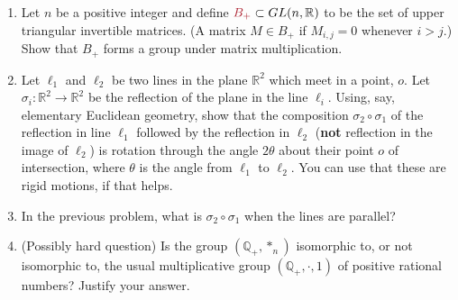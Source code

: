 \documentclass[12pt]{article}
\newcommand{\QQ}{{\mathbb Q}}
\newcommand{\RR}{{\mathbb R}}
\def\defcolor#1{{\color{Maroon}#1}}
\begin{document}
\begin{enumerate}

\item
  Let $n$ be a positive integer and define $\defcolor{B_+}\subset GL(n,\RR)$ to be the set of upper triangular invertible
  matrices.
  (A matrix $M\in B_+$ if $M_{i,j}=0$ whenever $i>j$.)
  Show that $B_+$ forms a group under matrix multiplication.


\item   Let $\ell_1$ and $\ell_2$ be two lines in the plane $\RR^2$ which meet in a point, $o$.
  Let $\sigma_i\colon \RR^2\to\RR^2$ be the reflection of the plane in the line $\ell_i$.
  Using, say, elementary Euclidean geometry, show that the composition $\sigma_2\circ \sigma_1$ of the reflection in line
  $\ell_1$ followed by the reflection in $\ell_2$  {\color{Magenta}({\bf not} reflection in the image of $\ell_2$)} is rotation through the
  angle $2\theta$ about their point $o$ of intersection, where $\theta$ is the angle from $\ell_1$ to $\ell_2$.
  You can use that these are rigid motions, if that helps.


\item  In the previous problem, what is $\sigma_2\circ\sigma_1$ when the lines are parallel?




\item  (Possibly hard question) Is the group $(\QQ_+,*_n)$ isomorphic to, or not isomorphic to, the usual multiplicative group
  $(\QQ_+, \cdot,1)$ of positive rational numbers?
  Justify your answer.

    
\end{enumerate}
\end{document}
